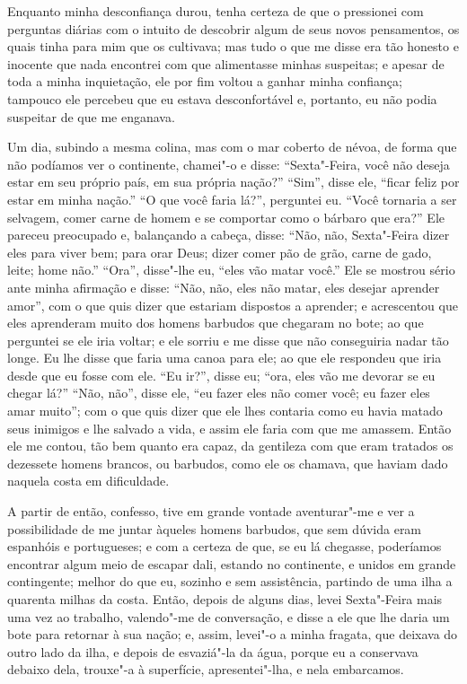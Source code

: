 Enquanto minha desconfiança durou, tenha certeza de que o pressionei com
perguntas diárias com o intuito de descobrir algum de seus novos
pensamentos, os quais tinha para mim que os cultivava; mas tudo o que me
disse era tão honesto e inocente que nada encontrei com que alimentasse
minhas suspeitas; e apesar de toda a minha inquietação, ele por fim
voltou a ganhar minha confiança; tampouco ele percebeu que eu estava
desconfortável e, portanto, eu não podia suspeitar de que me enganava.

Um dia, subindo a mesma colina, mas com o mar coberto de névoa, de forma
que não podíamos ver o continente, chamei"-o e disse: ``Sexta"-Feira, você
não deseja estar em seu próprio país, em sua própria nação?'' ``Sim'',
disse ele, ``ficar feliz por estar em minha nação.'' ``O que você faria
lá?'', perguntei eu. ``Você tornaria a ser selvagem, comer carne de
homem e se comportar como o bárbaro que era?'' Ele pareceu preocupado e,
balançando a cabeça, disse: ``Não, não, Sexta"-Feira dizer eles para
viver bem; para orar Deus; dizer comer pão de grão, carne de gado,
leite; home não.'' ``Ora'', disse"-lhe eu, ``eles vão matar você.'' Ele
se mostrou sério ante minha afirmação e disse: ``Não, não, eles não
matar, eles desejar aprender amor'', com o que quis dizer que estariam
dispostos a aprender; e acrescentou que eles aprenderam muito dos homens
barbudos que chegaram no bote; ao que perguntei se ele iria voltar; e
ele sorriu e me disse que não conseguiria nadar tão longe. Eu lhe disse
que faria uma canoa para ele; ao que ele respondeu que iria desde que eu
fosse com ele. ``Eu ir?'', disse eu; ``ora, eles vão me devorar se eu
chegar lá?'' ``Não, não'', disse ele, ``eu fazer eles não comer você; eu
fazer eles amar muito''; com o que quis dizer que ele lhes contaria como
eu havia matado seus inimigos e lhe salvado a vida, e assim ele faria
com que me amassem. Então ele me contou, tão bem quanto era capaz, da
gentileza com que eram tratados os dezessete homens brancos, ou
barbudos, como ele os chamava, que haviam dado naquela costa em
dificuldade.

A partir de então, confesso, tive em grande vontade aventurar"-me e ver a
possibilidade de me juntar àqueles homens barbudos, que sem dúvida eram
espanhóis e portugueses; e com a certeza de que, se eu lá chegasse,
poderíamos encontrar algum meio de escapar dali, estando no continente,
e unidos em grande contingente; melhor do que eu, sozinho e sem
assistência, partindo de uma ilha a quarenta milhas da costa. Então,
depois de alguns dias, levei Sexta"-Feira mais uma vez ao trabalho,
valendo"-me de conversação, e disse a ele que lhe daria um bote para
retornar à sua nação; e, assim, levei"-o a minha fragata, que deixava do
outro lado da ilha, e depois de esvaziá"-la da água, porque eu a
conservava debaixo dela, trouxe"-a à superfície, apresentei"-lha, e nela
embarcamos.

